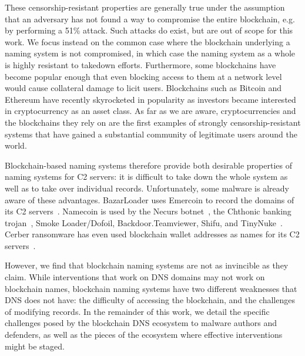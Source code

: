 These censorship-resistant properties are generally true under the assumption 
that an adversary has not found a way to compromise the entire blockchain, e.g. 
by performing a 51\% attack. Such 
attacks do exist, but are out of scope for this work. We focus instead on the 
common case where the blockchain underlying a naming system is not compromised, 
in which case the naming system as a whole is highly resistant to takedown 
efforts. Furthermore, some blockchains have become popular enough that even 
blocking access to them at a network level would cause collateral damage to 
licit users. Blockchains such as Bitcoin and Ethereum have recently 
skyrocketed in popularity as investors became interested in cryptocurrency as 
an asset class. As far as we are aware, cryptocurrencies and the blockchains 
they rely on are the first examples of strongly censorship-resistant systems 
that have gained a substantial community of legitimate users around the world.

Blockchain-based naming systems therefore provide both desirable properties of 
naming systems for C2 servers: it is difficult to take down the whole system as 
well as to take over individual records. Unfortunately, some malware is already 
aware of these advantages. BazarLoader uses Emercoin 
to record the domains of its C2 servers~\cite{brandt_bazarloader_2021}. 
Namecoin is used by the Necurs botnet~\cite{dgas_of_necurs}, the 
Chthonic banking trojan~\cite{malware_traffic_analysis_2016}, Smoke 
Loader/Dofoil, Backdoor.Teamviewer, Shifu, and TinyNuke~\cite{abusech_2017, 
mackie_cryptodns_2018}. Cerber ransomware has 
even used blockchain wallet addresses as names for its C2 
servers~\cite{pletinckx_malware_2018}.

However, we find that blockchain naming systems are not as invincible as they 
claim. While interventions that work on DNS domains may not work on blockchain 
names, blockchain naming systems have two different 
weaknesses that DNS does not have: the difficulty of accessing the blockchain,  
and the challenges of modifying records. In the remainder of this work, we 
detail the specific challenges posed by the blockchain DNS ecosystem to malware 
authors and defenders, as well as the pieces of the ecosystem where 
effective interventions might be staged.

